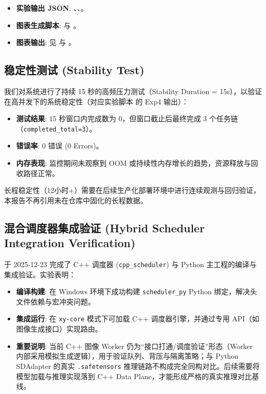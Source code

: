 \documentclass[a4paper,12pt]{article}
\begin{document}
\begin{itemize}
    \item \textbf{实验输出 JSON}: \texttt{}、\texttt{}、\texttt{}。
    \item \textbf{图表生成脚本}: \texttt{} 与 \texttt{}。
    \item \textbf{图表输出}: 见 \texttt{} 与 \texttt{}。
\end{itemize}

\subsection{稳定性测试 (Stability Test)}

我们对系统进行了持续 15 秒的高频压力测试（Stability Duration = 15s），以验证在高并发下的系统稳定性（对应实验脚本 \texttt{} 的 Exp4 输出）：

\begin{itemize}
    \item \textbf{测试结果}: 15 秒窗口内完成数为 0，但窗口截止后最终完成 3 个任务链（\texttt{completed\_total=3}）。
    \item \textbf{错误率}: 0 错误 (0 Errors)。
    \item \textbf{内存表现}: 监控期间未观察到 OOM 或持续性内存增长的趋势，资源释放与回收路径正常。
\end{itemize}

长程稳定性（12小时+）需要在后续生产化部署环境中进行连续观测与回归验证，本报告不再引用未在仓库中固化的长程数据。

\subsection{混合调度器集成验证 (Hybrid Scheduler Integration Verification)}

于 2025-12-23 完成了 C++ 调度器 (\texttt{cpp\_scheduler}) 与 Python 主工程的编译与集成验证。实验表明：

\begin{itemize}
    \item \textbf{编译构建}: 在 Windows 环境下成功构建 \texttt{scheduler\_py} Python 绑定，解决头文件依赖与宏冲突问题。
    \item \textbf{集成运行}: 在 \texttt{xy-core} 模式下可加载 C++ 调度器引擎，并通过专用 API（如图像生成接口）实现路由。
    \item \textbf{重要说明}: 当前 C++ 图像 Worker 仍为“接口打通/调度验证”形态（Worker 内部采用模拟生成逻辑），用于验证队列、背压与隔离策略；与 Python SDAdapter 的真实 \texttt{.safetensors} 推理链路不构成完全同构对比。后续需要将模型加载与推理实现落到 C++ Data Plane，才能形成严格的真实推理对比基线。
\end{itemize}
\end{document}
